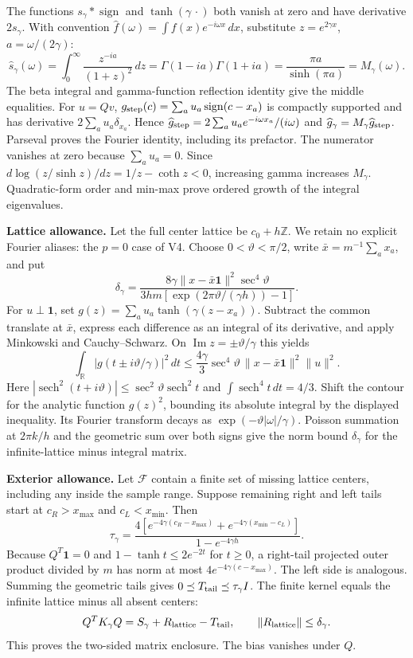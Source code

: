 \documentclass[11pt]{article}
\DeclareMathOperator{\sech}{sech}\DeclareMathOperator{\sign}{sign}
\begin{document}
The functions $s_\gamma*\sign$ and $\tanh(\gamma\,\cdot)$ both vanish at
zero and have derivative $2s_\gamma$. With convention
$\widehat f(\omega)=\int f(x)e^{-i\omega x}\,dx$, substitute
$z=e^{2\gamma x}$, $a=\omega/(2\gamma)$:
\[
\widehat s_\gamma(\omega)=\int_0^\infty\frac{z^{-ia}}{(1+z)^2}\,dz
=\Gamma(1-ia)\Gamma(1+ia)=\frac{\pi a}{\sinh(\pi a)}=M_\gamma(\omega).
\]
The beta integral and gamma-function reflection identity give the middle
equalities. For $u=Qv$, $g_{\rm step}(c)=\sum_a u_a\sign(c-x_a)$ is compactly
supported and has derivative $2\sum_a u_a\delta_{x_a}$. Hence
$\widehat g_{\rm step}=2\sum_a u_a e^{-i\omega x_a}/(i\omega)$ and
$\widehat g_\gamma=M_\gamma\widehat g_{\rm step}$. Parseval proves the
Fourier identity, including its prefactor. The numerator vanishes at zero
because $\sum_a u_a=0$. Since
$d\log(z/\sinh z)/dz=1/z-\coth z<0$, increasing gamma increases $M_\gamma$.
Quadratic-form order and min-max prove ordered growth of the integral eigenvalues.

\textbf{Lattice allowance.} Let the full center lattice be $c_0+h\mathbb Z$.
We retain no explicit Fourier aliases: the $p=0$ case of V4. Choose
$0<\vartheta<\pi/2$, write $\bar x=m^{-1}\sum_a x_a$, and put
\[
\delta_\gamma=
\frac{8\gamma\|x-\bar x\mathbf1\|^2\sec^4\vartheta}
{3hm[\exp(2\pi\vartheta/(\gamma h))-1]}.
\]
For $u\perp\mathbf1$, set $g(z)=\sum_a u_a\tanh(\gamma(z-x_a))$.
Subtract the common translate at $\bar x$, express each difference as an
integral of its derivative, and apply Minkowski and Cauchy--Schwarz.
On $\operatorname{Im}z=\pm\vartheta/\gamma$ this yields
\[
\int_{\mathbb R}|g(t\pm i\vartheta/\gamma)|^2\,dt
\le\frac{4\gamma}{3}\sec^4\vartheta\,
\|x-\bar x\mathbf1\|^2\|u\|^2.
\]
Here $|\sech^2(t+i\vartheta)|\le\sec^2\vartheta\sech^2t$ and
$\int\sech^4t\,dt=4/3$. Shift the contour for the analytic function $g(z)^2$,
bounding its absolute integral by the displayed inequality. Its Fourier
transform decays as $\exp(-\vartheta|\omega|/\gamma)$. Poisson summation at
$2\pi k/h$ and the geometric sum over both signs give the norm bound
$\delta_\gamma$ for the infinite-lattice minus integral matrix.

\textbf{Exterior allowance.} Let $\mathcal F$ contain a finite set of missing
lattice centers, including any inside the sample range. Suppose remaining
right and left tails start at $c_R>x_{\max}$ and $c_L<x_{\min}$. Then
\[
\tau_\gamma=
\frac{4[e^{-4\gamma(c_R-x_{\max})}+e^{-4\gamma(x_{\min}-c_L)}]}
{1-e^{-4\gamma h}}.
\]
Because $Q^T\mathbf1=0$ and $1-\tanh t\le2e^{-2t}$ for $t\ge0$, a
right-tail projected outer product divided by $m$ has norm at most
$4e^{-4\gamma(c-x_{\max})}$. The left side is analogous.
\clearpage
Summing the geometric tails gives $0\preceq T_{\rm tail}\preceq\tau_\gamma I$.
The finite kernel equals the infinite lattice minus all absent centers:
\[
Q^TK_\gamma Q=S_\gamma+R_{\rm lattice}-T_{\rm tail},\qquad
\|R_{\rm lattice}\|\le\delta_\gamma.
\]
This proves the two-sided matrix enclosure. The bias vanishes under $Q$.
\end{document}
